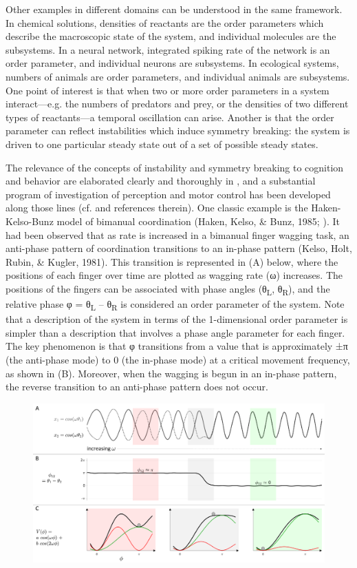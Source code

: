   Other examples in different domains can be understood in the same framework. In chemical solutions, densities of reactants are the order parameters which describe the macroscopic state of the system, and individual molecules are the subsystems. In a neural network, integrated spiking rate of the network is an order parameter, and individual neurons are subsystems. In ecological systems, numbers of animals are order parameters, and individual animals are subsystems. One point of interest is that when two or more order parameters in a system interact—e.g. the numbers of predators and prey, or the densities of two different types of reactants—a temporal oscillation can arise. Another is that the order parameter can reflect instabilities which induce symmetry breaking: the system is driven to one particular steady state out of a set of possible steady states. 

The relevance of the concepts of instability and symmetry breaking to cognition and behavior are elaborated clearly and thoroughly in \citet{Kelso1997}, and a substantial program of investigation of perception and motor control has been developed along those lines (cf. \citet{Kelso1997} and references therein). One classic example is the Haken-Kelso-Bunz model of bimanual coordination (Haken, Kelso, \& Bunz, 1985; \citealt{SchonerKelso1988}). It had been observed that as rate is increased in a bimanual finger wagging task, an anti-phase pattern of coordination transitions to an in-phase pattern (Kelso, Holt, Rubin, \& Kugler, 1981). This transition is represented in (A) below, where the positions of each finger over time are plotted as wagging rate (ω) increases. The positions of the fingers can be associated with phase angles (θ\textsubscript{L}, θ\textsubscript{R}), and the relative phase φ = θ\textsubscript{L} – θ\textsubscript{R} is considered an order parameter of the system. Note that a description of the system in terms of the 1-dimensional order parameter is simpler than a description that involves a phase angle parameter for each finger. The key phenomenon is that φ transitions from a value that is approximately ±π (the anti-phase mode) to 0 (the in-phase mode) at a critical movement frequency, as shown in (B). Moreover, when the wagging is begun in an in-phase pattern, the reverse transition to an anti-phase pattern does not occur.

  
\begin{figure}
\includegraphics[width=\textwidth]{figures/Tilsen-img167.png}
\caption{\missingcaption}
\label{fig:}
\end{figure}
 

